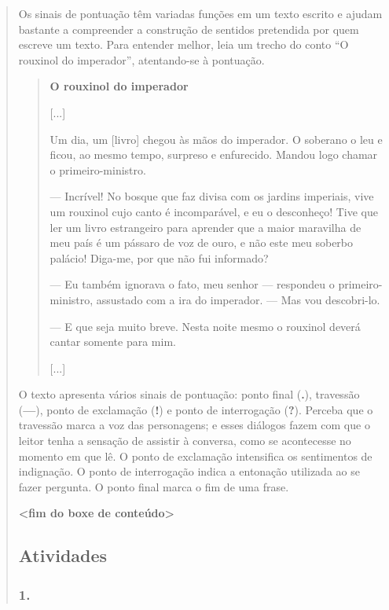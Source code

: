 \begin{quote}
\begin{iteize}
Os sinais de pontuação têm variadas funções em um texto escrito e ajudam
bastante a compreender a construção de sentidos pretendida por quem
escreve um texto. Para entender melhor, leia um trecho do conto ``O
rouxinol do imperador'', atentando-se à pontuação.

\begin{quote}
\textbf{O rouxinol do imperador}

{[}...{]}

Um dia, um {[}livro{]} chegou às mãos do imperador. O soberano o leu e
ficou, ao mesmo tempo, surpreso e enfurecido. Mandou logo chamar o
primeiro-ministro.

--- Incrível! No bosque que faz divisa com os jardins imperiais, vive um
rouxinol cujo canto é incomparável, e eu o desconheço! Tive que ler um
livro estrangeiro para aprender que a maior maravilha de meu país é um
pássaro de voz de ouro, e não este meu soberbo palácio! Diga-me, por que
não fui informado?

--- Eu também ignorava o fato, meu senhor --- respondeu o
primeiro-ministro, assustado com a ira do imperador. --- Mas vou
descobri-lo.

--- E que seja muito breve. Nesta noite mesmo o rouxinol deverá cantar
somente para mim.

{[}...{]}

\end{quote}

O texto apresenta vários sinais de pontuação: ponto final (\textbf{.}),
travessão (\textbf{---}), ponto de exclamação (\textbf{!}) e ponto de
interrogação (\textbf{?}). Perceba que o travessão marca a voz das
personagens; e esses diálogos fazem com que o leitor tenha a sensação de
assistir à conversa, como se acontecesse no momento em que lê. O ponto
de exclamação intensifica os sentimentos de indignação. O ponto de
interrogação indica a entonação utilizada ao se fazer pergunta. O ponto
final marca o fim de uma frase.

\textbf{\textless{}fim do boxe de conteúdo\textgreater{}}

\subsection{Atividades}\label{atividades-2}

\subsubsection{1. }\label{section-32}


\end{iteize}
\end{quote}
